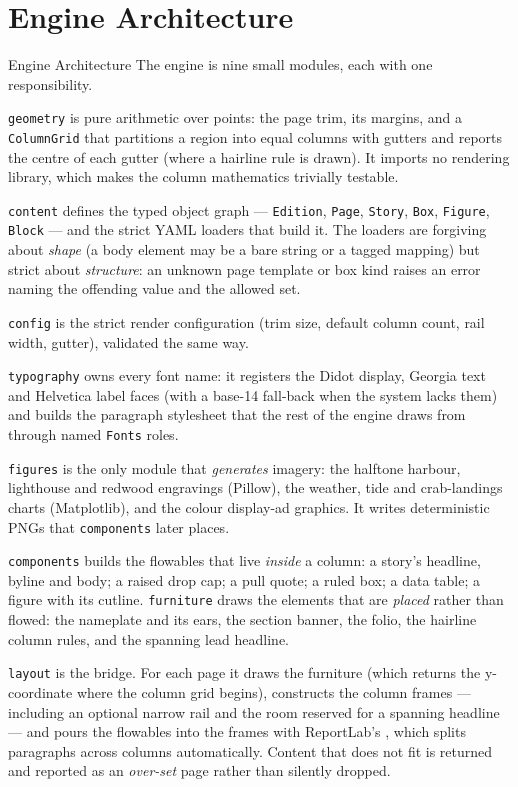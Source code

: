 \documentclass[
  ignorenonframetext,
]{beamer}
\author{\texorpdfstring{}{}}
\date{}
\begin{document}
\section{Engine Architecture}\label{engine-architecture}

\begin{frame}{Engine Architecture}
The engine is nine small modules, each with one responsibility.

\texttt{geometry} is pure arithmetic over points: the page trim, its
margins, and a \texttt{ColumnGrid} that partitions a region into equal
columns with gutters and reports the centre of each gutter (where a
hairline rule is drawn). It imports no rendering library, which makes
the column mathematics trivially testable.

\texttt{content} defines the typed object graph --- \texttt{Edition},
\texttt{Page}, \texttt{Story}, \texttt{Box}, \texttt{Figure},
\texttt{Block} --- and the strict YAML loaders that build it. The
loaders are forgiving about \emph{shape} (a body element may be a bare
string or a tagged mapping) but strict about \emph{structure}: an
unknown page template or box kind raises an error naming the offending
value and the allowed set.

\texttt{config} is the strict render configuration (trim size, default
column count, rail width, gutter), validated the same way.

\texttt{typography} owns every font name: it registers the Didot
display, Georgia text and Helvetica label faces (with a base-14
fall-back when the system lacks them) and builds the paragraph
stylesheet that the rest of the engine draws from through named
\texttt{Fonts} roles.

\texttt{figures} is the only module that \emph{generates} imagery: the
halftone harbour, lighthouse and redwood engravings (Pillow), the
weather, tide and crab-landings charts (Matplotlib), and the colour
display-ad graphics. It writes deterministic PNGs that
\texttt{components} later places.

\texttt{components} builds the flowables that live \emph{inside} a
column: a story's headline, byline and body; a raised drop cap; a pull
quote; a ruled box; a data table; a figure with its cutline.
\texttt{furniture} draws the elements that are \emph{placed} rather than
flowed: the nameplate and its ears, the section banner, the folio, the
hairline column rules, and the spanning lead headline.

\texttt{layout} is the bridge. For each page it draws the furniture
(which returns the y-coordinate where the column grid begins),
constructs the column frames --- including an optional narrow rail and
the room reserved for a spanning headline --- and pours the flowables
into the frames with ReportLab's , which
splits paragraphs across columns automatically. Content that does not
fit is returned and reported as an \emph{over-set} page rather than
silently dropped.


\end{frame}
\end{document}
